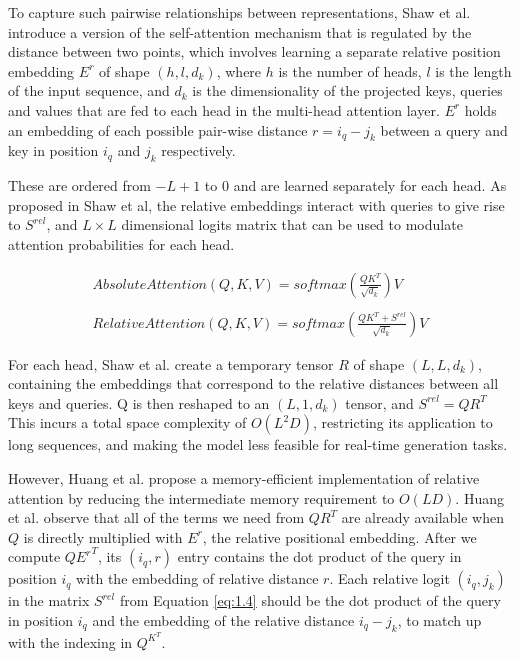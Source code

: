 \documentclass[../main.tex]{subfiles}
\begin{document}
To capture such pairwise relationships between representations, Shaw et al. \cite{shaw:1} introduce a version of the self-attention mechanism that is regulated by the distance between two points, which involves learning a separate relative position embedding $E^r$ of shape $(h,l,d_k)$, where $h$ is the number of heads, $l$ is the length of the input sequence, and $d_k$ is the dimensionality of the projected keys, queries and values that are fed to each head in the multi-head attention layer. $E^r$ holds an embedding of each possible pair-wise distance $r = i_q - j_k$ between a query and key in position $i_q$ and $j_k$ respectively. 

These are ordered from $-L + 1$ to $0$ and are learned separately for each head. As proposed in Shaw et al, the relative embeddings interact with queries to give rise to $S^{rel}$, and $L \times L$ dimensional logits matrix that can be used to modulate attention probabilities for each head. 

{
\begin{align*}
\label{eq:1.4}
Absolute Attention (Q,K,V) = softmax(\frac {QK^T} {\sqrt{d_k}})V \\ \\
Relative Attention (Q,K,V) = softmax(\frac {QK^T + S^{rel}} {\sqrt{d_k}})V
\tag{1.4}
\end{align*}
}

For each head, Shaw et al. create a temporary tensor $R$ of shape $(L, L, d_k)$, containing the embeddings that correspond to the relative distances between all keys and queries. Q is then reshaped to an $(L, 1, d_k)$ tensor, and $S^{rel} = QR^T$ This incurs a total space complexity of $O(L^2D)$, restricting its application to long sequences, and making the model less feasible for real-time generation tasks. 

However, Huang et al. \cite{Huang:1} propose a memory-efficient implementation of relative attention by reducing the intermediate memory requirement to $O(LD)$. Huang et al. observe that all of the terms we need from $QR^{T}$ are already available when $Q$ is directly multiplied with $E^r$, the relative positional embedding. After we compute $Q{E^{r}}^{T}$, its $(i_q,r)$ entry contains the dot product of the query in position $i_q$ with the embedding of relative distance $r$. Each relative logit $(i_q, j_k)$ in the matrix $S^{rel}$ from Equation \ref{eq:1.4} should be the dot product of the query in position $i_q$ and the embedding of the relative distance $i_q-j_k$, to match up with the indexing in $Q^{K^{T}}$. 
\end{document}
